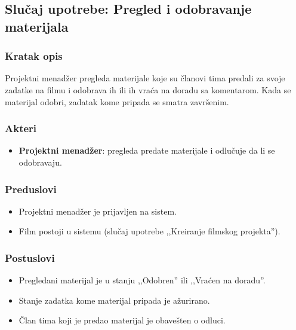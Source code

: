 \subsection{Slučaj upotrebe: Pregled i odobravanje materijala}

\subsubsection*{Kratak opis}

Projektni menadžer pregleda materijale koje su članovi tima predali za svoje zadatke na filmu i odobrava ih ili ih vraća na doradu sa komentarom. Kada se materijal odobri, zadatak kome pripada se smatra završenim.

\subsubsection*{Akteri}
\begin{itemize}
    \item \textbf{Projektni menadžer}: pregleda predate materijale i odlučuje da li se odobravaju.
\end{itemize}

\subsubsection*{Preduslovi}
\begin{itemize}
    \item Projektni menadžer je prijavljen na sistem.
    \item Film postoji u sistemu (slučaj upotrebe ,,Kreiranje filmskog projekta'').
\end{itemize}

\subsubsection*{Postuslovi}
\begin{itemize}
    \item Pregledani materijal je u stanju ,,Odobren'' ili ,,Vraćen na doradu''.
    \item Stanje zadatka kome materijal pripada je ažurirano.
    \item Član tima koji je predao materijal je obavešten o odluci.
\end{itemize}

